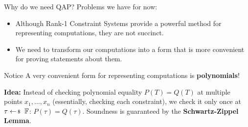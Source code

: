 \documentclass{zkdl-presentation-template}
\begin{document}
    \begin{frame}{Why do we need QAP?}
        Problems we have for now: \pause
        \begin{itemize}[label=]
            \item Although Rank-1 Constraint Systems provide a powerful method for representing
            computations, they are not succinct. \pause
            \item We need to transform our computations into a form that is more convenient for
            proving statements about them.
        \end{itemize}
        \pause

        \begin{alertblock}{Notice}
            A very convenient form for representing computations is \textbf{polynomials}!

            \vspace{10px}

            \textbf{Idea:} Instead of checking polynomial equality $P(T)=Q(T)$ at multiple points $x_1,\dots,x_n$ (essentially, checking each constraint), we check it only once at $\tau \leftarrowS \mathbb{F}$: $P(\tau)=Q(\tau)$. Soundness is guaranteed by the \textbf{Schwartz-Zippel Lemma}.
        \end{alertblock}
    \end{frame}
\end{document}
